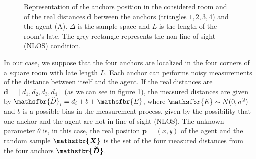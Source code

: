 \documentclass[%
    twoside, 
    a4paper
    ]{article}
\DeclareRobustCommand{\msf}[1]{%
  \ifcat\noexpand#1\relax\msfgreek{#1}\else\mathsfbr{#1}\fi%
}
\begin{document}
    \begin{figure}[t]
        \centering
        
        \caption{Representation of the anchors position in the considered room and of the real distances $\bm{d}$
        between the anchors (triangles $1,2,3,4$) and the agent (A). $\Delta$ is the sample space and $L$ is the length of the room's late.
        The grey rectangle represents the non-line-of-sight (NLOS) condition.}
        \label{fig:agent_position}
    \end{figure}

    In our case, we suppose that the four anchors are localized in the four corners of a square room with late 
    length $L$. Each anchor can performs noisy measurements of the distance between itself and the 
    agent. If the real distances are $\bm{d} = \left[ d_1, d_2, d_3, d_4 \right]$ (as we can see in figure 
    \ref{fig:agent_position}), the measured distances are
    given by $\msf{\breve{D}}_i = d_i + b + \msf{E} $, where $\msf{E} \sim N(0,\sigma^2)$ and $b$ is a possible
    bias in the measurement process, given by the possibility that one anchor and the agent are not in line of sight
    (NLOS).
    The unknown parameter $\theta$ is, in this case, the real position $ \bm{p} = (x,y) $ of the agent and the 
    random sample $\bm{\msf{X}}$ is the set of the four measured distances from the four anchors 
    $ \bm{\msf{\breve{D}}} $.
\end{document}

